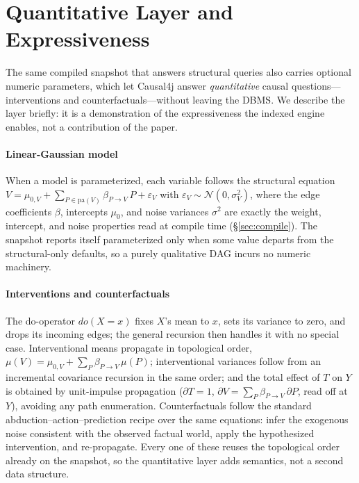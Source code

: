\section{Quantitative Layer and Expressiveness}\label{sec:quant}

The same compiled snapshot that answers structural queries also carries optional
numeric parameters, which let Causal4j answer \emph{quantitative} causal
questions---interventions and counterfactuals---without leaving the DBMS. We
describe the layer briefly: it is a demonstration of the expressiveness the
indexed engine enables, not a contribution of the paper.

\paragraph{Linear-Gaussian model}
When a model is parameterized, each variable follows the structural equation
$V = \mu_{0,V} + \sum_{P\in\mathrm{pa}(V)} \beta_{P\to V}\,P + \varepsilon_V$ with
$\varepsilon_V\sim\mathcal{N}(0,\sigma^2_V)$, where the edge coefficients
$\beta$, intercepts $\mu_0$, and noise variances $\sigma^2$ are exactly the
\textsf{weight}, \textsf{intercept}, and \textsf{noise} properties read at compile
time (\S\ref{sec:compile}). The snapshot reports itself parameterized only when
some value departs from the structural-only defaults, so a purely qualitative DAG
incurs no numeric machinery.

\paragraph{Interventions and counterfactuals}
The do-operator $do(X{=}x)$ fixes $X$'s mean to $x$, sets its variance to zero,
and drops its incoming edges; the general recursion then handles it with no
special case. Interventional means propagate in topological order,
$\mu(V)=\mu_{0,V}+\sum_P \beta_{P\to V}\,\mu(P)$; interventional variances follow
from an incremental covariance recursion in the same order; and the total effect
of $T$ on $Y$ is obtained by unit-impulse propagation
($\partial T{=}1$, $\partial V=\sum_P \beta_{P\to V}\,\partial P$, read off at
$Y$), avoiding any path enumeration. Counterfactuals follow the standard
abduction--action--prediction recipe over the same equations: infer the exogenous
noise consistent with the observed factual world, apply the hypothesized
intervention, and re-propagate. Every one of these reuses the topological order
already on the snapshot, so the quantitative layer adds semantics, not a second
data structure.

